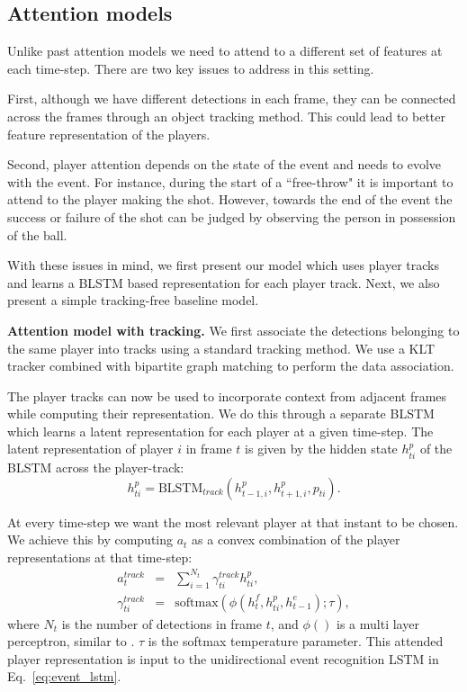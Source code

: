 \subsection{Attention models}
Unlike past attention models \cite{Bahdnau_arxiv14,Xu_arxiv15,Yao_arxiv15} we need to attend to a different set of
features at each time-step. There are two key issues to address in this
setting.

First, although we have different detections in each frame, they
can be connected across the frames through an object tracking
method. This could lead to better feature representation of the
players.

Second, player attention depends on the state of the event and needs to evolve
with the event.  For instance, during the start of a ``free-throw" it is
important to attend to the player making the shot. However, towards the end of
the event the success or failure of the shot can be judged by observing the
person in possession of the ball.

With these issues in mind, we first present our model which uses player tracks
and learns a BLSTM based representation for each player track. Next, we also
present a simple tracking-free baseline model.

\noindent \textbf{Attention model with tracking.}
We first associate the detections
belonging to the same player into tracks using a standard
tracking method. We use a KLT tracker combined with
bipartite graph matching \cite{munkres1957algorithms} to perform the data association.

The player tracks can now be used to incorporate context
from adjacent frames while computing their representation.
We do this through a separate BLSTM which learns a latent
representation for each player at a given time-step.
The latent representation of player $i$ in frame $t$ is
given by the hidden state
$h_{ti}^p$ of the BLSTM across the player-track:
\[
  h_{ti}^p = \mbox{BLSTM}_{track}(h_{t-1,i}^p, h_{t+1,i}^p, p_{ti}).
\]

At every time-step we want the most relevant player at that
instant to be chosen. We achieve this by computing
$a_t$ as a convex combination of the player representations
at that time-step:
\begin{eqnarray} 
\label{eq:track}
  a_t^{track} & = & \sum_{i=1}^{N_t} \gamma_{ti}^{track} h_{ti}^p, \\ \nonumber
  \gamma_{ti}^{track} & = & \text{softmax} \left(\phi\left(h^f_t, h^p_{ti}, h^e_{t-1}\right); \tau\right),
\end{eqnarray}where $N_t$ is the number of detections in frame $t$, and $\phi()$ is a 
multi layer perceptron, similar to \cite{Bahdnau_arxiv14}. $\tau$ is the softmax temperature parameter.
This attended player representation is input to the
unidirectional event recognition LSTM in Eq.~\ref{eq:event_lstm}.


